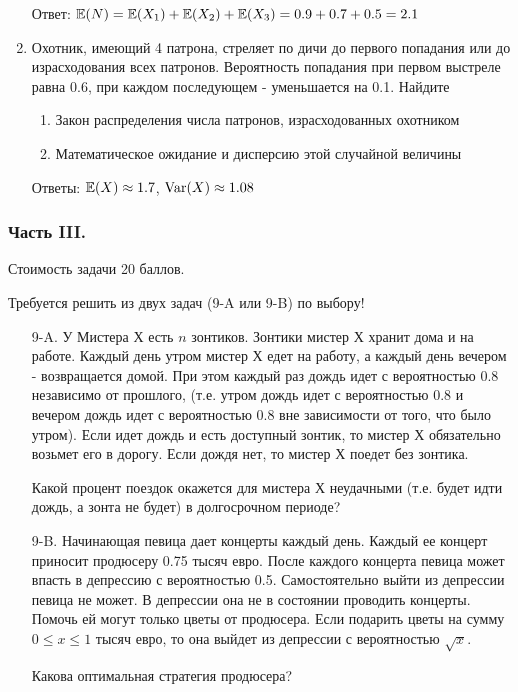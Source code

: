 \documentclass[12pt, a4paper]{article}\usepackage[]{graphicx}\usepackage[]{color}
\begin{document}
\begin{enumerate}
Ответ: $\mathbb{E}(N)=\mathbb{E}(X_1)+\mathbb{E}(X_2)+\mathbb{E}(X_3)=0.9+0.7+0.5=2.1$

\item Охотник, имеющий 4 патрона, стреляет по дичи до первого
попадания или до израсходования всех патронов. Вероятность
попадания при первом выстреле равна 0.6, при каждом последующем -
уменьшается на 0.1. Найдите
\begin{enumerate}
\item Закон распределения числа патронов, израсходованных охотником
\item Математическое ожидание и дисперсию этой случайной величины
\end{enumerate}

Ответы: $\mathbb{E}(X)\approx 1.7$, $\operatorname{Var}(X)\approx 1.08$
\end{enumerate}

\subsubsection*{Часть III.}

Стоимость задачи 20 баллов.

Требуется решить \textbf{} из двух задач (9-A или 9-B) по
выбору!

\begin{enumerate}
\item[9-A.] У Мистера Х есть $n$ зонтиков. Зонтики мистер Х хранит дома и на работе. Каждый день утром мистер Х едет на работу, а каждый день вечером - возвращается домой. При этом каждый раз дождь идет с вероятностью 0.8 независимо от прошлого, (т.е. утром дождь идет с вероятностью 0.8 и вечером дождь идет с вероятностью 0.8 вне зависимости от того, что было утром). Если идет дождь и есть доступный зонтик, то мистер Х обязательно возьмет его в дорогу. Если дождя нет, то мистер Х поедет без зонтика.

Какой процент поездок окажется для мистера Х неудачными (т.е. будет идти дождь, а зонта не будет) в долгосрочном периоде?

\item[9-B.] Начинающая певица дает концерты каждый день. Каждый ее концерт приносит продюсеру 0.75 тысяч евро. После каждого концерта певица может впасть в депрессию с вероятностью 0.5. Самостоятельно выйти из депрессии певица не может. В депрессии она не в состоянии проводить концерты. Помочь ей могут только цветы от продюсера. Если подарить цветы на сумму $0\le x\le 1$ тысяч евро, то она выйдет из депрессии с вероятностью $\sqrt{x}$.

Какова оптимальная стратегия продюсера?
\end{enumerate}
\end{document}
